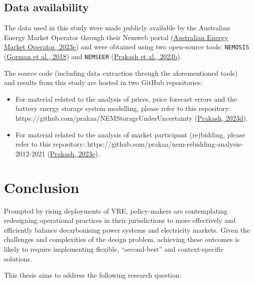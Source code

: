 \documentclass[12pt,a4paper,]{report}
\providecommand{\tightlist}{%
  \setlength{\itemsep}{0pt}\setlength{\parskip}{0pt}}
\begin{document}
\hypertarget{data-availability}{%
\section*{Data availability}\label{data-availability}}

The data used in this study were made publicly available by the
Australian Energy Market Operator through their Nemweb portal
(\protect\hyperlink{ref-australianenergymarketoperatorNemwebMarketData2023}{Australian
Energy Market Operator, 2023e}) and were obtained using two open-source
tools: \texttt{NEMOSIS}
(\protect\hyperlink{ref-gormanNEMOSISNEMOpen2018}{Gorman et al., 2018})
and \texttt{NEMSEER}
(\protect\hyperlink{ref-prakashNEMSEERPythonPackage2023}{Prakash et al.,
2023b}).

The source code (including data extraction through the aforementioned
tools) and results from this study are hosted in two GitHub
repositories:

\begin{itemize}
\tightlist
\item
  For material related to the analysis of prices, price forecast errors
  and the battery energy storage system modelling, please refer to this
  repository: https://github.com/prakaa/NEMStorageUnderUncertainty
  (\protect\hyperlink{ref-prakashNEMStorageUnderUncertainty2023}{Prakash,
  2023d}).
\item
  For material related to the analysis of market participant
  (re)bidding, please refer to this repository:
  https://github.com/prakaa/nem-rebidding-analysis-2012-2021
  (\protect\hyperlink{ref-prakashNEMReBidding2023}{Prakash, 2023e}).
\end{itemize}

\hypertarget{sec:conclusion}{%
\chapter{Conclusion}\label{sec:conclusion}}

Prompted by rising deployments of VRE, policy-makers are contemplating
redesigning operational practices in their jurisdictions to more
effectively and efficiently balance decarbonising power systems and
electricity markets. Given the challenges and complexities of the design
problem, achieving these outcomes is likely to require implementing
flexible, ``second-best'' and context-specific solutions.

This thesis aims to address the following research question:
\end{document}
